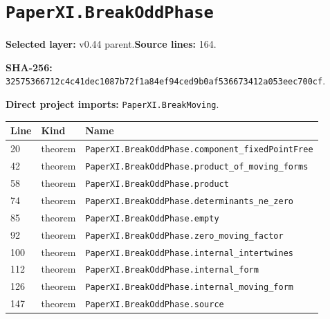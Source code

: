 \documentclass[10pt,oneside]{book}
\begin{document}
\section{\texorpdfstring{\nolinkurl{PaperXI.BreakOddPhase}}{PaperXI.BreakOddPhase}}\label{module:PaperXI.BreakOddPhase}

\textbf{Selected layer:} v0.44 parent.\quad\textbf{Source lines:} 164.\par\textbf{SHA-256:} {\scriptsize\nolinkurl{32575366712c4c41dec1087b72f1a84ef94ced9b0af536673412a053eec700cf}}.


\textbf{Direct project imports:} \nolinkurl{PaperXI.BreakMoving}.

\begin{longtable}{@{}p{}p{}p{}@{}}\toprule Line&Kind&Name\\\midrule\endhead

20&theorem&\nolinkurl{PaperXI.BreakOddPhase.component_fixedPointFree}\\

42&theorem&\nolinkurl{PaperXI.BreakOddPhase.product_of_moving_forms}\\

58&theorem&\nolinkurl{PaperXI.BreakOddPhase.product}\\

74&theorem&\nolinkurl{PaperXI.BreakOddPhase.determinants_ne_zero}\\

85&theorem&\nolinkurl{PaperXI.BreakOddPhase.empty}\\

92&theorem&\nolinkurl{PaperXI.BreakOddPhase.zero_moving_factor}\\

100&theorem&\nolinkurl{PaperXI.BreakOddPhase.internal_intertwines}\\

112&theorem&\nolinkurl{PaperXI.BreakOddPhase.internal_form}\\

126&theorem&\nolinkurl{PaperXI.BreakOddPhase.internal_moving_form}\\

147&theorem&\nolinkurl{PaperXI.BreakOddPhase.source}\\

\bottomrule\end{longtable}
\end{document}
